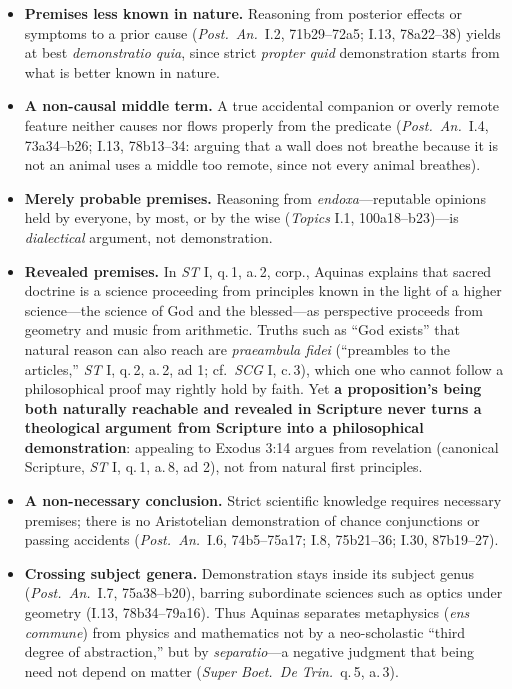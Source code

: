 \begin{itemize}
\item \textbf{Premises less known in nature.} Reasoning from posterior effects or symptoms to a prior cause (\emph{Post.\ An.}\ I.2, 71b29--72a5; I.13, 78a22--38) yields at best \emph{demonstratio quia}, since strict \emph{propter quid} demonstration starts from what is better known in nature.
\item \textbf{A non-causal middle term.} A true accidental companion or overly remote feature neither causes nor flows properly from the predicate (\emph{Post.\ An.}\ I.4, 73a34--b26; I.13, 78b13--34: arguing that a wall does not breathe because it is not an animal uses a middle too remote, since not every animal breathes).
\item \textbf{Merely probable premises.} Reasoning from \emph{endoxa}---reputable opinions held by everyone, by most, or by the wise (\emph{Topics} I.1, 100a18--b23)---is \emph{dialectical} argument, not demonstration.
\item \textbf{Revealed premises.} In \emph{ST} I, q.\,1, a.\,2, corp., Aquinas explains that sacred doctrine is a science proceeding from principles known in the light of a higher science---the science of God and the blessed---as perspective proceeds from geometry and music from arithmetic. Truths such as ``God exists'' that natural reason can also reach are \emph{praeambula fidei} (``preambles to the articles,'' \emph{ST} I, q.\,2, a.\,2, ad 1; cf.\ \emph{SCG} I, c.\,3), which one who cannot follow a philosophical proof may rightly hold by faith. Yet \textbf{a proposition's being both naturally reachable and revealed in Scripture never turns a theological argument from Scripture into a philosophical demonstration}: appealing to Exodus 3:14 argues from revelation (canonical Scripture, \emph{ST} I, q.\,1, a.\,8, ad 2), not from natural first principles.
\item \textbf{A non-necessary conclusion.} Strict scientific knowledge requires necessary premises; there is no Aristotelian demonstration of chance conjunctions or passing accidents (\emph{Post.\ An.}\ I.6, 74b5--75a17; I.8, 75b21--36; I.30, 87b19--27).
\item \textbf{Crossing subject genera.} Demonstration stays inside its subject genus (\emph{Post.\ An.}\ I.7, 75a38--b20), barring subordinate sciences such as optics under geometry (I.13, 78b34--79a16). Thus Aquinas separates metaphysics (\emph{ens commune}) from physics and mathematics not by a neo-scholastic ``third degree of abstraction,'' but by \emph{separatio}---a negative judgment that being need not depend on matter (\emph{Super Boet.\ De Trin.}\ q.\,5, a.\,3).
\end{itemize}

